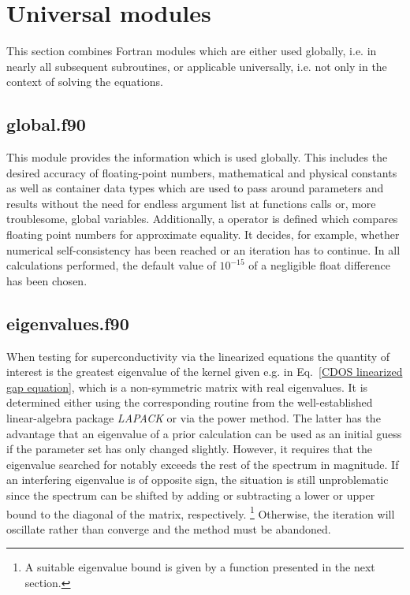 \section{Universal modules}

This section combines Fortran modules which are either used globally, i.e. in
nearly all subsequent subroutines, or applicable universally, i.e. not only in
the context of solving the  equations.

\subsection{global.f90}

This module provides the information which is used globally. This includes the
desired accuracy of floating-point numbers, mathematical and physical constants
as well as container data types which are used to pass around parameters and
results without the need for endless argument list at functions calls or, more
troublesome, global variables. Additionally, a operator is defined which
compares floating point numbers for approximate equality. It decides, for
example, whether numerical self-consistency has been reached or an iteration has
to continue. In all calculations performed, the default value of $10^{-15}$ of a
negligible float difference has been chosen.



\subsection{eigenvalues.f90}

When testing for superconductivity via the linearized 
equations the quantity of interest is the greatest eigenvalue of the kernel
given e.g. in Eq.~\ref{CDOS linearized gap equation}, which is a non-symmetric
matrix with real eigenvalues. It is determined either using the corresponding
routine from the well-established linear-algebra package \emph{LAPACK}
\cite{LAPACK99} or via the power method. The latter has the advantage that an
eigenvalue of a prior calculation can be used as an initial guess if the
parameter set has only changed slightly. However, it requires that the
eigenvalue searched for notably exceeds the rest of the spectrum in magnitude.
If an interfering eigenvalue is of opposite sign, the situation is still
unproblematic since the spectrum can be shifted by adding or subtracting a lower
or upper bound to the diagonal of the matrix, respectively.%
%
\footnote{A suitable eigenvalue bound is given by a function presented in the
next section.}
%
Otherwise, the iteration will oscillate rather than converge and the method must
be abandoned.

